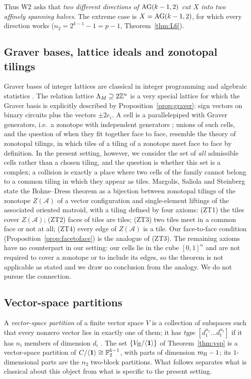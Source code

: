 Thus W2 asks that \emph{two different directions of $\mathrm{AG}(k-1,2)$ cut $X$ into two affinely spanning halves}. The extreme case is $X=\mathrm{AG}(k-1,2)$, for which every direction works ($n_2=2^{k-1}-1=p-1$, Theorem~\ref{thm:L6}).

\subsection{Graver bases, lattice ideals and zonotopal tilings}

Graver bases of integer lattices are classical in integer programming and algebraic statistics \cite{Graver1975,Schrijver1986,Sturmfels1996}. The relation lattice $\Lambda_M\supseteq2\mathbb Z^n$ is a very special lattice for which the Graver basis is explicitly described by Proposition~\ref{prop:graver}: sign vectors on binary circuits plus the vectors $\pm2e_i$. A cell is a parallelepiped with Graver generators, i.e.\ a zonotope with independent generators \cite{Ziegler1995}; unions of such cells, and the question of when they fit together face to face, resemble the theory of zonotopal tilings, in which tiles of a tiling of a zonotope meet face to face by definition. In the present setting, however, we consider the set of \emph{all} admissible cells rather than a chosen tiling, and the question is whether this set is a complex; a collision is exactly a place where two cells of the family cannot belong to a common tiling in which they appear as tiles. Margolis, Saliola and Steinberg \cite{MSS} state the Bohne--Dress theorem as a bijection between zonotopal tilings of the zonotope $Z(\mathcal A)$ of a vector configuration and single-element liftings of the associated oriented matroid, with a tiling defined by four axioms: (ZT1) the tiles cover $Z(\mathcal A)$; (ZT2) faces of tiles are tiles; (ZT3) two tiles meet in a common face or not at all; (ZT4) every edge of $Z(\mathcal A)$ is a tile. Our face-to-face condition (Proposition~\ref{prop:facetoface}) is the analogue of (ZT3). The remaining axioms have no counterpart in our setting: our cells lie in the cube $[0,1]^n$ and are not required to cover a zonotope or to include its edges, so the theorem is not applicable as stated and we draw no conclusion from the analogy. We do not pursue the connection.

\subsection{Vector-space partitions}

A \emph{vector-space partition} of a finite vector space $V$ is a collection of subspaces such that every nonzero vector lies in exactly one of them; it has \emph{type} $[d_1^{n_1}\dots d_t^{n_t}]$ if it has $n_i$ members of dimension $d_i$ \cite{Heden2012}. The set $\{V_\Pi/\langle\mathbf 1\rangle\}$ of Theorem~\ref{thm:vsp} is a vector-space partition of $C/\langle\mathbf 1\rangle\cong\mathbb F_2^{k-1}$, with parts of dimension $m_\Pi-1$; its $1$-dimensional parts are the $n_2$ two-block partitions. What follows separates what is classical about this object from what is specific to the present setting.

